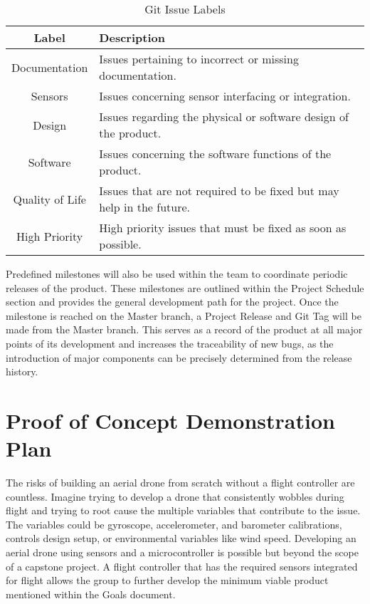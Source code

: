 \documentclass{article}
\begin{document}
\begin{table}[h]
\caption {Git Issue Labels} \label{tab:title}
\begin{center}
\begin{tabular}{ | c | l | }
\hline
Label & Description \\
\hline
Documentation & Issues pertaining to incorrect or missing documentation. \\
\hline
Sensors & Issues concerning sensor interfacing or integration. \\
\hline
Design & Issues regarding the physical or software design of the product. \\
\hline
Software & Issues concerning the software functions of the product. \\
\hline
Quality of Life & Issues that are not required to be fixed but may help in the future. \\
\hline
High Priority & High priority issues that must be fixed as soon as possible. \\
\hline
\end{tabular}
\end{center}
\end{table}

\clearpage

Predefined milestones will also be used within the team to coordinate periodic releases of the product. These milestones are outlined within the Project Schedule section and provides the general development path for the project. Once the milestone is reached on the Master branch, a Project Release and Git Tag will be made from the Master branch. This serves as a record of the product at all major points of its development and increases the traceability of new bugs, as the introduction of major components can be precisely determined from the release history. 

\section{Proof of Concept Demonstration Plan}

The risks of building an aerial drone from scratch without a flight controller are countless. Imagine trying to develop a drone that consistently wobbles during flight and trying to root cause the multiple variables that contribute to the issue. The variables could be gyroscope, accelerometer, and barometer calibrations, controls design setup, or environmental variables like wind speed. Developing an aerial drone using sensors and a microcontroller is possible but beyond the scope of a capstone project. A flight controller that has the required sensors integrated for flight allows the group to further develop the minimum viable product mentioned within the Goals document. 
\end{document}
